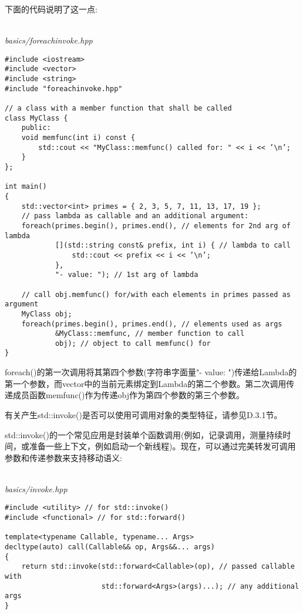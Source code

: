 下面的代码说明了这一点:

\hspace*{\fill} \\ %
\noindent
\textit{basics/foreachinvoke.hpp}
\begin{lstlisting}[style=styleCXX]
#include <iostream>
#include <vector>
#include <string>
#include "foreachinvoke.hpp"

// a class with a member function that shall be called
class MyClass {
	public:
	void memfunc(int i) const {
		std::cout << "MyClass::memfunc() called for: " << i << ’\n’;
	}
};

int main()
{
	std::vector<int> primes = { 2, 3, 5, 7, 11, 13, 17, 19 };
	// pass lambda as callable and an additional argument:
	foreach(primes.begin(), primes.end(), // elements for 2nd arg of lambda
			[](std::string const& prefix, int i) { // lambda to call
				std::cout << prefix << i << ’\n’;
			},
			"- value: "); // 1st arg of lambda

	// call obj.memfunc() for/with each elements in primes passed as argument
	MyClass obj;
	foreach(primes.begin(), primes.end(), // elements used as args
			&MyClass::memfunc, // member function to call
			obj); // object to call memfunc() for
}
\end{lstlisting}

foreach()的第一次调用将其第四个参数(字符串字面量"- value: ")传递给Lambda的第一个参数，而vector中的当前元素绑定到Lambda的第二个参数。第二次调用传递成员函数memfunc()作为传递obj作为第四个参数的第三个参数。

有关产生std::invoke()是否可以使用可调用对象的类型特征，请参见D.3.1节。


std::invoke()的一个常见应用是封装单个函数调用(例如，记录调用，测量持续时间，或准备一些上下文，例如启动一个新线程)。现在，可以通过完美转发可调用参数和传递参数来支持移动语义:

\hspace*{\fill} \\ %
\noindent
\textit{basics/invoke.hpp}
\begin{lstlisting}[style=styleCXX]
#include <utility> // for std::invoke()
#include <functional> // for std::forward()

template<typename Callable, typename... Args>
decltype(auto) call(Callable&& op, Args&&... args)
{
	return std::invoke(std::forward<Callable>(op), // passed callable with
					   std::forward<Args>(args)...); // any additional args
}
\end{lstlisting}

